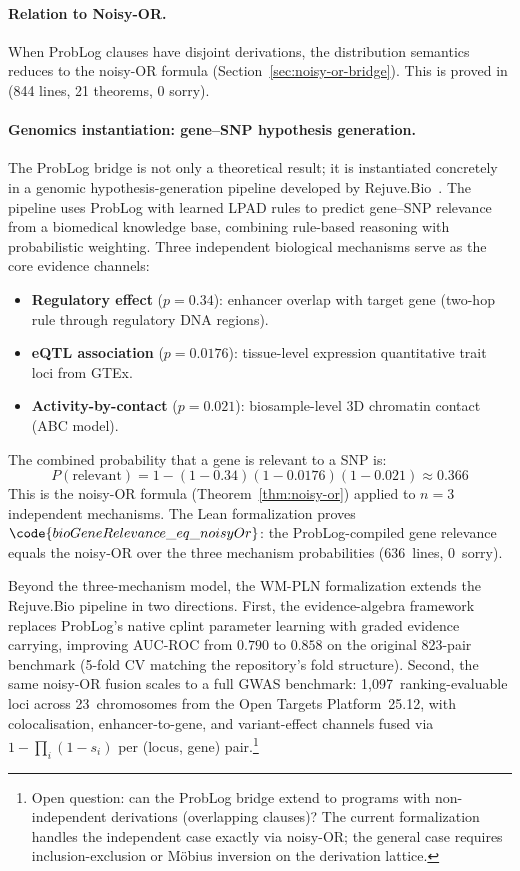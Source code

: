 \documentclass[11pt,openany]{report}
\begin{document}
\paragraph{Relation to Noisy-OR.}
When ProbLog clauses have disjoint derivations, the distribution
semantics reduces to the noisy-OR formula
(Section~\ref{sec:noisy-or-bridge}).  This is proved in
 (844 lines, 21 theorems, 0 sorry).

\paragraph{Genomics instantiation: gene--SNP hypothesis generation.}
The ProbLog bridge is not only a theoretical result; it is
instantiated concretely in a genomic hypothesis-generation pipeline
developed by Rejuve.Bio~\cite{RejuveBioHypGen2025}.  The pipeline
uses ProbLog with learned LPAD rules to predict gene--SNP relevance
from a biomedical knowledge base, combining rule-based reasoning with
probabilistic weighting.  Three independent biological mechanisms
serve as the core evidence channels:
\begin{itemize}
\item \textbf{Regulatory effect} ($p = 0.34$): enhancer overlap with
  target gene (two-hop rule through regulatory DNA regions).
\item \textbf{eQTL association} ($p = 0.0176$): tissue-level
  expression quantitative trait loci from GTEx.
\item \textbf{Activity-by-contact} ($p = 0.021$): biosample-level 3D
  chromatin contact (ABC model).
\end{itemize}

\noindent
The combined probability that a gene is relevant to a SNP is:
\[
  P(\text{relevant}) = 1 - (1 - 0.34)(1 - 0.0176)(1 - 0.021) \approx 0.366
\]
This is the noisy-OR formula (Theorem~\ref{thm:noisy-or}) applied to
$n = 3$ independent mechanisms.  The Lean formalization proves
$\code{bioGeneRelevance\_eq\_noisyOr}$: the ProbLog-compiled gene
relevance equals the noisy-OR over the three mechanism probabilities
(636~lines, 0~sorry).

Beyond the three-mechanism model, the WM-PLN formalization extends the
Rejuve.Bio pipeline in two directions.  First, the evidence-algebra
framework replaces ProbLog's native cplint parameter learning with
graded evidence carrying, improving AUC-ROC from $0.790$ to $0.858$ on
the original 823-pair benchmark (5-fold CV matching the repository's
fold structure).  Second, the same noisy-OR fusion scales to a
full GWAS benchmark: 1{,}097~ranking-evaluable loci across
23~chromosomes from the Open Targets Platform~25.12, with
colocalisation, enhancer-to-gene, and variant-effect channels fused
via $1 - \prod_i(1 - s_i)$ per (locus, gene)
pair.\footnote{Open question: can the ProbLog bridge extend to
programs with non-independent derivations (overlapping clauses)?
The current formalization handles the independent case exactly via
noisy-OR; the general case requires inclusion-exclusion or
M\"{o}bius inversion on the derivation lattice.}
\end{document}
